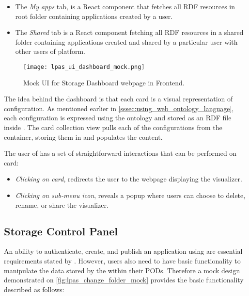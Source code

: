 \begin{itemize}
    \item The \textit{My apps} tab, is a React component that fetches all RDF resources in root \lpas{} folder containing applications created by a user. 
    \item The \textit{Shared} tab is a React component fetching all RDF resources in a shared \lpas{} folder containing applications created and shared by a particular user with other users of \lpas{} platform.
\end{itemize}


\begin{figure}[h]
\centering
\texttt{[image: lpas\_ui\_dashboard\_mock.png]}
\caption{Mock UI for Storage Dashboard webpage in \lpa{} Frontend.}
\label{fig:lpas_ui_dashboard_mock}
\end{figure}



The idea behind the dashboard is that each card is a visual representation of \lpa{} configuration. As mentioned earlier in \autoref{sssec:using_web_ontology_language}, each configuration is expressed using the \lpas{} ontology and stored as an RDF file inside \solid{}. The card collection view pulls each of the configurations from the container, storing them in \solid{} and populates the content. 

The user of \lpa{} has a set of straightforward interactions that can be performed on card:
\begin{itemize}
    \item \textit{Clicking on card}, redirects the user to the webpage displaying the visualizer.
    \item \textit{Clicking on sub-menu icon}, reveals a popup where users can choose to delete, rename, or share the visualizer.
\end{itemize}


\subsection{Storage Control Panel}

An ability to authenticate, create, and publish an application using \solid{} are essential requirements stated by \lpa{}. However, users also need to have basic functionality to manipulate the data stored by the \lpas{} within their PODs. Therefore a mock design demonstrated on \autoref{fig:lpas_change_folder_mock} provides the basic functionality described as follows:

